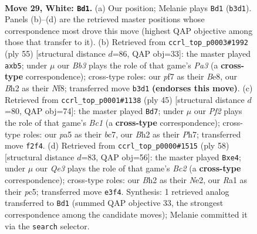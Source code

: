\documentclass[11pt]{article}
\begin{document}
\clearpage

\begin{figure}[p]\centering
\begin{subfigure}{0.46\textwidth}\centering
\resizebox{\linewidth}{!}{%
\newchessgame
\chessboard[
  setfen={r5k1/1p3pb1/1n3qp1/p2p4/3n3p/1B2Q2P/PP3PPB/RN4K1 w - - 0 29},
  showmover=false,
  pgfstyle=straightmove, color=movearrow, markmove={b3-d1}
]}
\caption{}
\end{subfigure}\hfill
\begin{subfigure}{0.46\textwidth}\centering
\resizebox{\linewidth}{!}{%
\newchessgame
\chessboard[
  setfen={4bnk1/r5p1/pq1bp2p/1P6/2p1B3/2N1PN1P/1PQ2PP1/2R3K1 b - - 0 28},
  showmover=false,
  pgfstyle=straightmove, color=movearrow, markmove={a6-b5}
]}
\caption{}
\end{subfigure}
\\[4pt]
\begin{subfigure}{0.46\textwidth}\centering
\resizebox{\linewidth}{!}{%
\newchessgame
\chessboard[
  setfen={r1b3k1/ppB3pp/2p2p2/2bq4/3N1Q1P/2P5/PP3PP1/4R1K1 b - - 0 23},
  showmover=false,
  pgfstyle=straightmove, color=movearrow, markmove={c8-d7}
]}
\caption{}
\end{subfigure}\hfill
\begin{subfigure}{0.46\textwidth}\centering
\resizebox{\linewidth}{!}{%
\newchessgame
\chessboard[
  setfen={4r1k1/3q1pp1/2b1p2p/p1p5/2P1n3/P4QB1/1PB1N1PP/6K1 w - - 0 30},
  showmover=false,
  pgfstyle=straightmove, color=movearrow, markmove={c2-e4}
]}
\caption{}
\end{subfigure}
\caption{\textbf{Move 29, White: \texttt{Bd1}.} (a) Our position; Melanie plays \texttt{Bd1} (\texttt{b3d1}). Panels (b)--(d) are the retrieved master positions whose correspondence most drove this move (highest QAP objective among those that transfer to it). (b) Retrieved from \texttt{ccrl\_top\_p0003\#1992} (ply 55) [structural distance $d$=86, QAP obj=33]: the master played \texttt{axb5}; under $\mu$ our \emph{Bb3} plays the role of that game's \emph{Pa3} (a \textbf{cross-type} correspondence); cross-type roles: our \emph{p}f7 as their \emph{B}e8, our \emph{B}h2 as their \emph{N}f8; transferred move \texttt{b3d1} \textbf{(endorses this move)}. (c) Retrieved from \texttt{ccrl\_top\_p0001\#1138} (ply 45) [structural distance $d$=80, QAP obj=74]: the master played \texttt{Bd7}; under $\mu$ our \emph{Pf2} plays the role of that game's \emph{Bc1} (a \textbf{cross-type} correspondence); cross-type roles: our \emph{p}a5 as their \emph{b}c7, our \emph{B}h2 as their \emph{P}h7; transferred move \texttt{f2f4}. (d) Retrieved from \texttt{ccrl\_top\_p0000\#1515} (ply 58) [structural distance $d$=83, QAP obj=56]: the master played \texttt{Bxe4}; under $\mu$ our \emph{Qe3} plays the role of that game's \emph{Bc2} (a \textbf{cross-type} correspondence); cross-type roles: our \emph{B}h2 as their \emph{N}e2, our \emph{R}a1 as their \emph{p}c5; transferred move \texttt{e3f4}. Synthesis: 1 retrieved analog transferred to \texttt{Bd1} (summed QAP objective 33, the strongest correspondence among the candidate moves); Melanie committed it via the \texttt{search} selector.}
\label{fig:thought-m56}
\end{figure}
\end{document}
